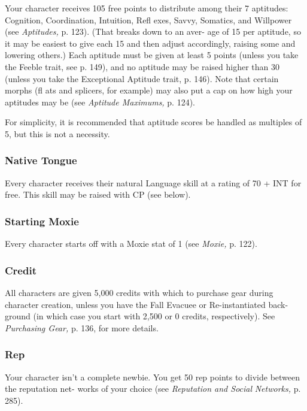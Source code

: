 Your character receives 105 free points to distribute 
among their 7 aptitudes: Cognition, Coordination, 
Intuition, Refl exes, Savvy, Somatics, and Willpower 
(see \textit{Aptitudes,} p. 123). (That breaks down to an aver-
age of 15 per aptitude, so it may be easiest to give 
each 15 and then adjust accordingly, raising some and 
lowering others.) Each aptitude must be given at least 
5 points (unless you take the Feeble trait, see p. 149), 
and no aptitude may be raised higher than 30 (unless 
you take the Exceptional Aptitude trait, p. 146). Note 
that certain morphs (fl ats and splicers, for example) 
may also put a cap on how high your aptitudes may 
be (see \textit{Aptitude Maximums,} p. 124).

For simplicity, it is recommended that aptitude 
scores be handled as multiples of 5, but this is not a 
necessity.

\subsubsection{Native Tongue}

Every character receives their natural Language skill 
at a rating of 70 + INT for free. This skill may be 
raised with CP (see below).

\subsubsection{Starting Moxie}

Every character starts off with a Moxie stat of 1 (see 
\textit{Moxie,} p. 122).

\subsubsection{Credit}

All characters are given 5,000 credits with which 
to purchase gear during character creation, unless 
you have the Fall Evacuee or Re-instantiated back-
ground (in which case you start with 2,500 or 0 
credits, respectively). See \textit{Purchasing Gear,} p. 136, 
for more details.

\subsubsection{Rep}

Your character isn't a complete newbie. You get 50 
rep points to divide between the reputation net-
works of your choice (see \textit{Reputation and Social }
\textit{Networks,} p. 285).

